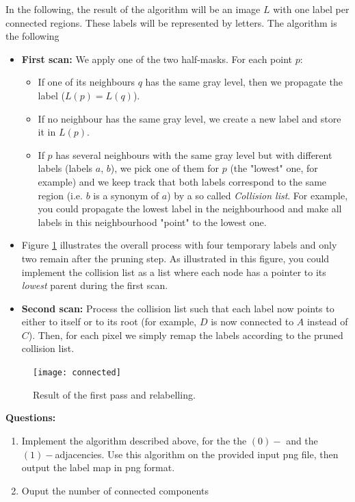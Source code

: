\documentclass[a4paper, 11pt, french]{article}
\begin{document}
\smallskip
\par In the following, the result of the algorithm will be an image $L$ with one label per connected regions. These labels will be represented by letters. The algorithm is the following
	\begin{itemize}
	\item \textbf{First scan:} We apply one of the two half-masks. For each point $p$:
		\begin{itemize}
		\item If one of its neighbours $q$ has the same gray level, then we propagate the label ($L(p) = L(q)$).
		\item If no neighbour has the same gray level, we create a new label and store it in $L(p)$.
		\item If $p$ has several neighbours with the same gray level but with different labels (labels $a$, $b$), we pick one of them for $p$ (the "lowest" one, for example) and we keep track that both labels correspond to the same region (i.e. $b$ is a synonym of $a$) by a so called \emph{Collision list}. For example, you could propagate the lowest label in the neighbourhood and make all labels in this neighbourhood "point" to the lowest one.
		\end{itemize}
	\item Figure \ref{fig:connected} illustrates the overall process with four temporary labels and only two remain after the pruning step. As illustrated in this figure, you could implement the collision list as a list where each node has a pointer to its \emph{lowest} parent during the first scan.
	
	\item \textbf{Second scan:} Process the collision list such that each label now points to either to itself or to its root (for example, $D$ is now connected to $A$ instead of $C$). Then, for each pixel we simply remap the labels according to the pruned collision list.
	\end{itemize}

\begin{figure}[ht]
	\begin{center}
	\texttt{[image: connected]}
	\caption{Result of the first pass and relabelling.\label{fig:connected}}
	\end{center}
\end{figure}


{\bf Questions:}
\begin{enumerate}
	\item Implement the algorithm described above, for the the $(0)-$ and the $(1)-$adjacencies. Use this algorithm on the provided input png file, then output the label map in png format. 
	\item Ouput the number of connected components
\end{enumerate}
\end{document}
